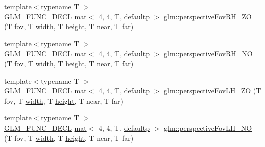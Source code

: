 \begin{DoxyCompactItemize}
\item 
{\footnotesize template$<$typename T $>$ }\\\mbox{\hyperlink{setup_8hpp_ab2d052de21a70539923e9bcbf6e83a51}{G\+L\+M\+\_\+\+F\+U\+N\+C\+\_\+\+D\+E\+CL}} \mbox{\hyperlink{structglm_1_1mat}{mat}}$<$ 4, 4, T, \mbox{\hyperlink{namespaceglm_a36ed105b07c7746804d7fdc7cc90ff25a9d21ccd8b5a009ec7eb7677befc3bf51}{defaultp}} $>$ \mbox{\hyperlink{group__gtc__matrix__transform_ga7dcbb25331676f5b0795aced1a905c44}{glm\+::perspective\+Fov\+R\+H\+\_\+\+ZO}} (T fov, T \mbox{\hyperlink{_s_d_l__opengl_8h_a9a82cf3caff84cabc4598e2619faac17}{width}}, T \mbox{\hyperlink{_s_d_l__opengl_8h_aa352f2804b9902ac30769c00dde75d5f}{height}}, T near, T far)
\item 
{\footnotesize template$<$typename T $>$ }\\\mbox{\hyperlink{setup_8hpp_ab2d052de21a70539923e9bcbf6e83a51}{G\+L\+M\+\_\+\+F\+U\+N\+C\+\_\+\+D\+E\+CL}} \mbox{\hyperlink{structglm_1_1mat}{mat}}$<$ 4, 4, T, \mbox{\hyperlink{namespaceglm_a36ed105b07c7746804d7fdc7cc90ff25a9d21ccd8b5a009ec7eb7677befc3bf51}{defaultp}} $>$ \mbox{\hyperlink{group__gtc__matrix__transform_ga257b733ff883c9a065801023cf243eb2}{glm\+::perspective\+Fov\+R\+H\+\_\+\+NO}} (T fov, T \mbox{\hyperlink{_s_d_l__opengl_8h_a9a82cf3caff84cabc4598e2619faac17}{width}}, T \mbox{\hyperlink{_s_d_l__opengl_8h_aa352f2804b9902ac30769c00dde75d5f}{height}}, T near, T far)
\item 
{\footnotesize template$<$typename T $>$ }\\\mbox{\hyperlink{setup_8hpp_ab2d052de21a70539923e9bcbf6e83a51}{G\+L\+M\+\_\+\+F\+U\+N\+C\+\_\+\+D\+E\+CL}} \mbox{\hyperlink{structglm_1_1mat}{mat}}$<$ 4, 4, T, \mbox{\hyperlink{namespaceglm_a36ed105b07c7746804d7fdc7cc90ff25a9d21ccd8b5a009ec7eb7677befc3bf51}{defaultp}} $>$ \mbox{\hyperlink{group__gtc__matrix__transform_gabdd37014f529e25b2fa1b3ba06c10d5c}{glm\+::perspective\+Fov\+L\+H\+\_\+\+ZO}} (T fov, T \mbox{\hyperlink{_s_d_l__opengl_8h_a9a82cf3caff84cabc4598e2619faac17}{width}}, T \mbox{\hyperlink{_s_d_l__opengl_8h_aa352f2804b9902ac30769c00dde75d5f}{height}}, T near, T far)
\item 
{\footnotesize template$<$typename T $>$ }\\\mbox{\hyperlink{setup_8hpp_ab2d052de21a70539923e9bcbf6e83a51}{G\+L\+M\+\_\+\+F\+U\+N\+C\+\_\+\+D\+E\+CL}} \mbox{\hyperlink{structglm_1_1mat}{mat}}$<$ 4, 4, T, \mbox{\hyperlink{namespaceglm_a36ed105b07c7746804d7fdc7cc90ff25a9d21ccd8b5a009ec7eb7677befc3bf51}{defaultp}} $>$ \mbox{\hyperlink{group__gtc__matrix__transform_gad18a4495b77530317327e8d466488c1a}{glm\+::perspective\+Fov\+L\+H\+\_\+\+NO}} (T fov, T \mbox{\hyperlink{_s_d_l__opengl_8h_a9a82cf3caff84cabc4598e2619faac17}{width}}, T \mbox{\hyperlink{_s_d_l__opengl_8h_aa352f2804b9902ac30769c00dde75d5f}{height}}, T near, T far)

\end{DoxyCompactItemize}
